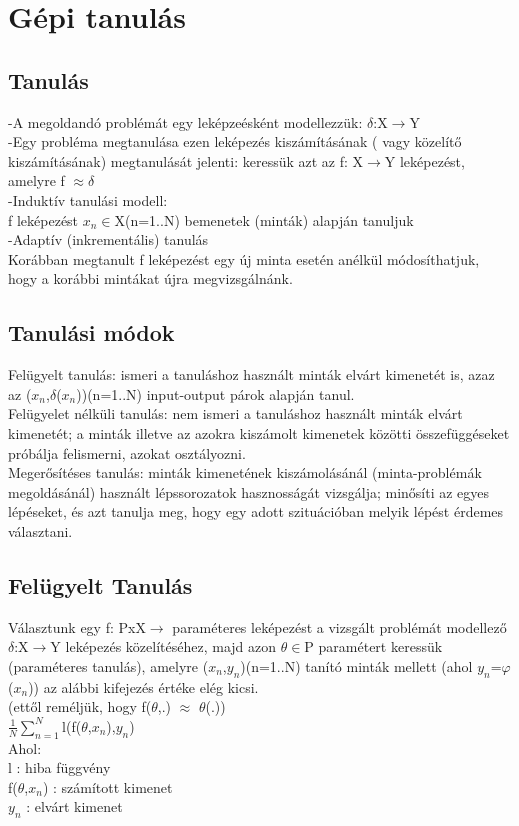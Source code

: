 \documentclass{article}
\begin{document}
	 \section{Gépi tanulás}
	 \subsection{Tanulás}
	 -A megoldandó problémát egy leképzeésként modellezzük: $\delta$:X$\rightarrow$Y\\
	 -Egy probléma megtanulása ezen leképezés kiszámításának ( vagy közelítő kiszámításának) megtanulását jelenti: keressük azt az f: X$\rightarrow$Y leképezést, amelyre f $\approx$$\delta$\\
	 -Induktív tanulási modell:\\
	 f leképezést $x_n$$\in$X(n=1..N) bemenetek (minták) alapján tanuljuk\\
	 -Adaptív (inkrementális) tanulás\\
	 Korábban megtanult f leképezést egy új minta esetén anélkül módosíthatjuk, hogy a korábbi mintákat újra megvizsgálnánk.
	 
	 \subsection{Tanulási módok}
	 Felügyelt tanulás: ismeri a tanuláshoz használt minták elvárt kimenetét is, azaz az ($x_n$,$\delta$($x_n$))(n=1..N) input-output párok alapján tanul.\\
	 Felügyelet nélküli tanulás: nem ismeri a tanuláshoz használt minták elvárt kimenetét; a minták illetve az azokra kiszámolt kimenetek közötti összefüggéseket próbálja felismerni, azokat osztályozni.\\
	 Megerősítéses tanulás: minták kimenetének kiszámolásánál (minta-problémák megoldásánál) használt lépssorozatok hasznosságát vizsgálja; minősíti az egyes lépéseket, és azt tanulja meg, hogy egy adott szituációban melyik lépést érdemes választani.
	 
	 \newpage
	 \subsection{Felügyelt Tanulás}
	 Választunk egy f: PxX$\rightarrow$ paraméteres leképezést a vizsgált problémát modellező $\delta$:X$\rightarrow$Y leképezés közelítéséhez, majd azon $\theta$$\in$P paramétert keressük (paraméteres tanulás), amelyre ($x_n$,$y_n$)(n=1..N) tanító minták mellett (ahol $y_n$=$\varphi$($x_n$)) az alábbi kifejezés értéke elég kicsi.\\
	 (ettől reméljük, hogy f($\theta$,.) $\approx$ $\theta$(.))\\
	 $\frac{1}{N}$$\sum_{n=1}^{N}$l(f($\theta$,$x_n$),$y_n$)\\
	 Ahol:\\
	 l : hiba függvény\\
	 f($\theta$,$x_n$) : számított kimenet\\
	 $y_n$ : elvárt kimenet\\
	 
\end{document}
